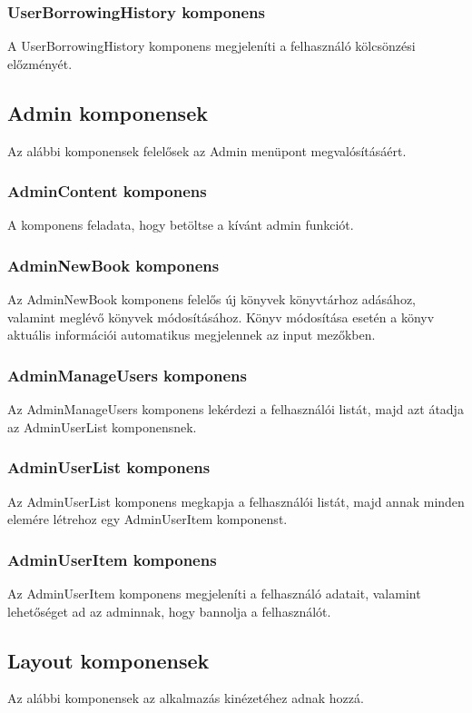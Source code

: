 \subsubsection{UserBorrowingHistory komponens}
A UserBorrowingHistory komponens megjeleníti a felhasználó kölcsönzési előzményét. 

\subsection{Admin komponensek}
Az alábbi komponensek felelősek az Admin menüpont megvalósításáért.

\subsubsection{AdminContent komponens}
A komponens feladata, hogy betöltse a kívánt admin funkciót.

\subsubsection{AdminNewBook komponens}
Az AdminNewBook komponens felelős új könyvek könyvtárhoz adásához, valamint meglévő könyvek módosításához. Könyv módosítása esetén a könyv aktuális információi automatikus megjelennek az input mezőkben.

\subsubsection{AdminManageUsers komponens}
Az AdminManageUsers komponens lekérdezi a felhasználói listát, majd azt átadja az AdminUserList komponensnek.

\subsubsection{AdminUserList komponens}
Az AdminUserList komponens megkapja a felhasználói listát, majd annak minden elemére létrehoz egy AdminUserItem komponenst.

\subsubsection{AdminUserItem komponens}
Az AdminUserItem komponens megjeleníti a felhasználó adatait, valamint lehetőséget ad az adminnak, hogy bannolja a felhasználót.

\subsection{Layout komponensek}
Az alábbi komponensek az alkalmazás kinézetéhez adnak hozzá.

